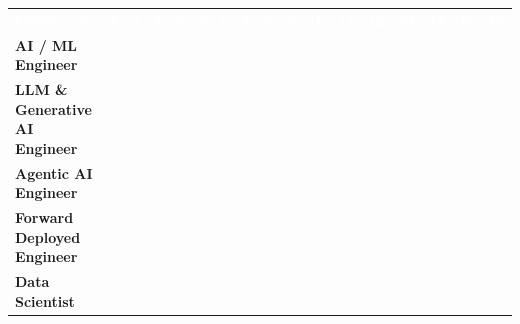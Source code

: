 \documentclass[10pt,a4paper]{article}
\renewcommand{\arraystretch}{1.25}
\newcommand{\hdr}{\rowcolor{navy}}
\newcommand{\hw}[1]{\textcolor{white}{\bfseries #1}}
\begin{document}
{\footnotesize\setlength{\tabcolsep}{2pt}\renewcommand{\arraystretch}{1.55}\begin{tabular}{@{}>{\raggedright\arraybackslash}p{5.0cm}>{\centering\arraybackslash}p{0.52cm}>{\centering\arraybackslash}p{0.52cm}>{\centering\arraybackslash}p{0.52cm}>{\centering\arraybackslash}p{0.52cm}>{\centering\arraybackslash}p{0.52cm}>{\centering\arraybackslash}p{0.52cm}>{\centering\arraybackslash}p{0.52cm}>{\centering\arraybackslash}p{0.52cm}>{\centering\arraybackslash}p{0.52cm}>{\centering\arraybackslash}p{0.52cm}>{\centering\arraybackslash}p{0.52cm}>{\centering\arraybackslash}p{0.52cm}>{\centering\arraybackslash}p{0.52cm}>{\centering\arraybackslash}p{0.52cm}>{\centering\arraybackslash}p{0.52cm}>{\centering\arraybackslash}p{0.52cm}@{}}\hdr\hw{Career role}&\hw{1}&\hw{2}&\hw{3}&\hw{4}&\hw{5}&\hw{6}&\hw{7}&\hw{8}&\hw{9}&\hw{10}&\hw{11}&\hw{12}&\hw{13}&\hw{14}&\hw{15}&\hw{16}\\
\textbf{AI / ML Engineer}&\cellcolor{goldl!55}\leavevmode{\color{navy}●}&\cellcolor{goldl!55}\leavevmode{\color{navy}●}&\cellcolor{goldl!55}\leavevmode{\color{navy}●}&&&\cellcolor{goldbg}\leavevmode{\color{gold}○}&&&\cellcolor{goldl!55}\leavevmode{\color{navy}●}&&&&&&&\\
\rowcolor{rowbg}\textbf{LLM \& Generative AI Engineer}&&&\cellcolor{goldl!55}\leavevmode{\color{navy}●}&&&\cellcolor{goldl!55}\leavevmode{\color{navy}●}&\cellcolor{goldbg}\leavevmode{\color{gold}○}&\cellcolor{goldl!55}\leavevmode{\color{navy}●}&&\cellcolor{goldbg}\leavevmode{\color{gold}○}&&&&&&\\
\textbf{Agentic AI Engineer}&\cellcolor{goldbg}\leavevmode{\color{gold}○}&&&&&\cellcolor{goldl!55}\leavevmode{\color{navy}●}&\cellcolor{goldl!55}\leavevmode{\color{navy}●}&&\cellcolor{goldbg}\leavevmode{\color{gold}○}&\cellcolor{goldl!55}\leavevmode{\color{navy}●}&&&&&&\cellcolor{goldbg}\leavevmode{\color{gold}○}\\
\rowcolor{rowbg}\textbf{Forward Deployed Engineer}&\cellcolor{goldbg}\leavevmode{\color{gold}○}&&&&&\cellcolor{goldl!55}\leavevmode{\color{navy}●}&\cellcolor{goldl!55}\leavevmode{\color{navy}●}&&\cellcolor{goldl!55}\leavevmode{\color{navy}●}&\cellcolor{goldbg}\leavevmode{\color{gold}○}&&&&&&\cellcolor{goldl!55}\leavevmode{\color{navy}●}\\
\textbf{Data Scientist}&&\cellcolor{goldl!55}\leavevmode{\color{navy}●}&\cellcolor{goldbg}\leavevmode{\color{gold}○}&&&&&&\cellcolor{goldl!55}\leavevmode{\color{navy}●}&\cellcolor{goldbg}\leavevmode{\color{gold}○}&&&&&&\\

\end{tabular}}
\end{document}
